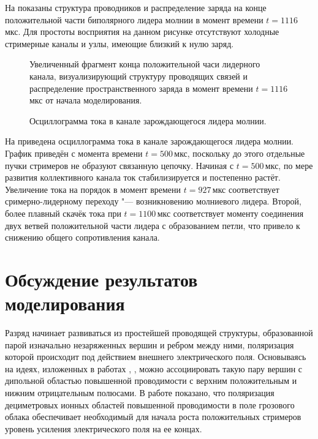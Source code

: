 На  показаны структура проводников и распределение заряда на конце положительной части биполярного лидера молнии в момент времени $t = 1116$\,мкс. Для простоты восприятия на данном рисунке отсутствуют холодные стримерные каналы и узлы, имеющие близкий к нулю заряд.

\begin{figure}[h]
	\caption{Увеличенный фрагмент  конца положительной часи лидерного канала, визуализирующий структуру проводящих связей и распределение пространственного заряда в момент времени $t = 1116$\,мкс от начала моделирования.}
	\label{fig:model-leader-positive-end}
\end{figure}

\begin{figure}[h]
	\caption{Осциллограмма тока в канале зарождающегося лидера молнии.}
	\label{fig:full-current-vs-time}
\end{figure}

На  приведена осциллограмма тока в канале зарождающегося лидера молнии. График приведён с момента времени $t = 500$\,мкс, поскольку до этого отдельные пучки стримеров не образуют связанную цепочку. Начиная с $t = 500$\,мкс, по мере развития коллективного канала ток стабилизируется и постепенно растёт. Увеличение тока на порядок в момент времени $t = 927$\,мкс соответствует сримерно-лидерному переходу "--- возникновению молниевого лидера. Второй, более плавный скачёк тока при $t = 1100$\,мкс соответствует моменту соединения двух ветвей положительной части лидера с образованием петли, что привело к снижению общего сопротивления канала.

\section{Обсуждение результатов моделирования}
\label{sec:model-talks}
Разряд начинает развиваться из простейшей проводящей структуры, образованной парой изначально незаряженных вершин и ребром между ними, поляризация которой происходит под действием внешнего электрического поля. Основываясь на идеях, изложенных в работах \cite{Iudin2017}, \cite{todo}, можно ассоциировать такую пару вершин с дипольной областью повышенной проводимости с верхним положительным и нижним отрицательным полюсами. В работе \cite{todo} показано, что поляризация дециметровых ионных областей повышенной проводимости в поле грозового облака обеспечивает необходимый для начала роста положительных стримеров уровень усиления электрического поля на ее концах.


